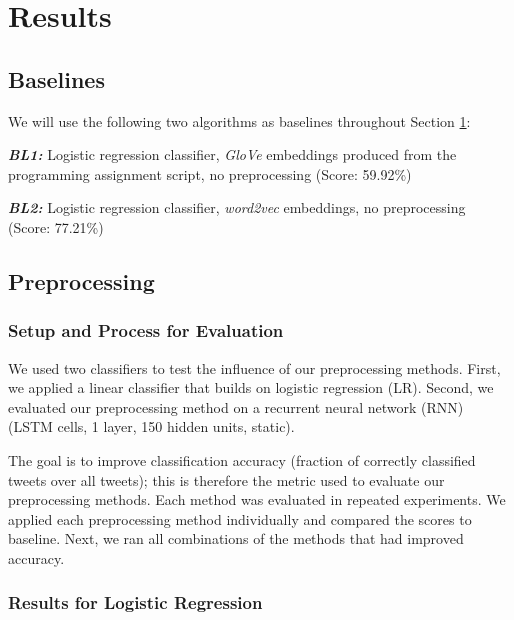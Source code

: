 \section{Results}\label{sec:results}

\subsection{Baselines}\label{sec:results:baselines}

We will use the following two algorithms as baselines throughout Section \ref{sec:results}:

\begin{compactitem}
	\item \textbf{\textit{BL1:}} Logistic regression classifier, \textit{GloVe} embeddings produced from the programming assignment script, no preprocessing (Score: 59.92\%)
	\item \textbf{\textit{BL2:}} Logistic regression classifier, \textit{word2vec} embeddings, no preprocessing (Score: 77.21\%)
\end{compactitem}

\subsection{Preprocessing}

\subsubsection{Setup and Process for Evaluation}

We used two classifiers to test the influence of our preprocessing methods. First, we applied a linear classifier that builds on logistic regression (LR). Second, we evaluated our preprocessing method on a recurrent neural network (RNN) (LSTM cells, 1 layer, 150 hidden units, static).

The goal is to improve classification accuracy (fraction of correctly classified tweets over all tweets); this is therefore the metric used to evaluate our preprocessing methods. Each method was evaluated in repeated experiments. We applied each preprocessing method individually and compared the scores to baseline. Next, we ran all combinations of the methods that had improved accuracy.

\subsubsection{Results for Logistic Regression}

